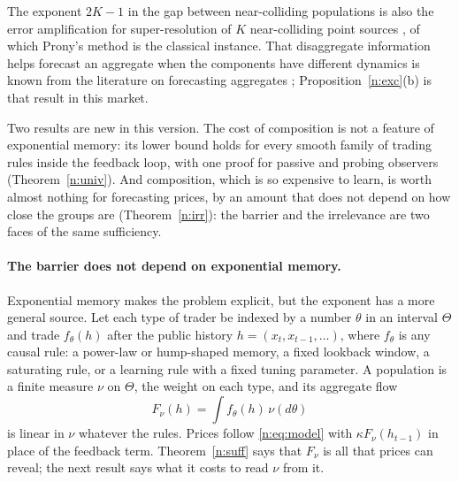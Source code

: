  The exponent $2K-1$ in the gap between near-colliding populations is also the error amplification for super-resolution of $K$ near-colliding point sources \citep{batenkov2021}, of which Prony's method is the classical instance. That disaggregate information helps forecast an aggregate when the components have different dynamics is known from the literature on forecasting aggregates \citep{lutkepohl1987,hendry2011}; Proposition~\ref{n:exc}(b) is that result in this market.

 Two results are new in this version. The cost of composition is not a feature of exponential memory: its lower bound holds for every smooth family of trading rules inside the feedback loop, with one proof for passive and probing observers (Theorem~\ref{n:univ}). And composition, which is so expensive to learn, is worth almost nothing for forecasting prices, by an amount that does not depend on how close the groups are (Theorem~\ref{n:irr}): the barrier and the irrelevance are two faces of the same sufficiency.

\paragraph{The barrier does not depend on exponential memory.} Exponential memory makes the problem explicit, but the exponent has a more general source. Let each type of trader be indexed by a number $\theta$ in an interval $\Theta$ and trade $f_\theta(h)$ after the public history $h=(x_t,x_{t-1},\ldots)$, where $f_\theta$ is any causal rule: a power-law or hump-shaped memory, a fixed lookback window, a saturating rule, or a learning rule with a fixed tuning parameter. A population is a finite measure $\nu$ on $\Theta$, the weight on each type, and its aggregate flow
\[
F_\nu(h)=\int f_\theta(h)\,\nu(d\theta)
\]
is linear in $\nu$ whatever the rules. Prices follow \eqref{n:eq:model} with $\kappa F_\nu(h_{t-1})$ in place of the feedback term. Theorem~\ref{n:suff} says that $F_\nu$ is all that prices can reveal; the next result says what it costs to read $\nu$ from it.

